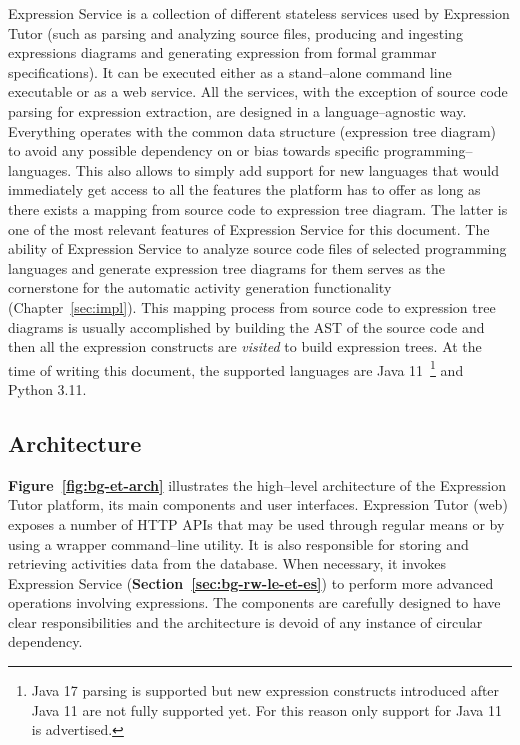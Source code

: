 \begin{chapterBody}
Expression Service is a collection of different stateless services used by
Expression Tutor (such as parsing and analyzing source files, producing and
ingesting expressions diagrams and generating expression from formal
grammar specifications). It can be executed either as a stand–alone command
line executable or as a web service.
All the services, with the exception of source code parsing for expression
extraction, are designed in a language–agnostic way. 
Everything operates with the common data structure (expression tree diagram) to
avoid any possible dependency on or bias towards specific
programming–languages. This also allows to simply add support for new languages
that would immediately get access to all the features the platform has to offer
as long as there exists a mapping from source code to expression tree diagram.
The latter is one of the most relevant features of Expression Service for this
document. The ability of Expression Service to analyze source code files of
selected programming languages and generate expression tree diagrams for them
serves as the cornerstone for the automatic activity generation functionality
(Chapter~\ref{sec:impl}). This mapping process from source code to expression
tree diagrams is usually accomplished by building the AST of the source code
and then all the expression constructs are \textit{visited} to build expression
trees. At the time of writing this document, the supported languages are
Java 11~\footnote{Java 17 parsing is supported but new expression constructs 
introduced after Java 11 are not fully supported yet. For this reason only
support for Java 11 is advertised.} and Python 3.11.

\subsection{Architecture}

\textbf{Figure~\ref{fig:bg-et-arch}} illustrates the high–level architecture
of the Expression Tutor platform, its main components and user interfaces.
Expression Tutor (web) exposes a number of HTTP APIs that may be used through
regular means or by using a wrapper command–line utility. It is also responsible
for storing and retrieving activities data from the database. When necessary,
it invokes Expression Service (\textbf{Section~\ref{sec:bg-rw-le-et-es}}) to
perform more advanced operations involving expressions. The components are
carefully designed to have clear responsibilities and the architecture is devoid
of any instance of circular dependency.


\end{chapterBody}
